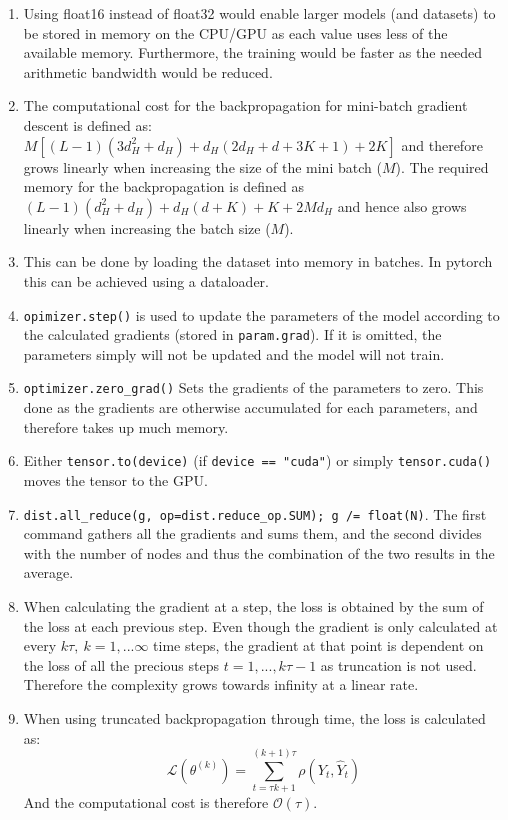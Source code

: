 \documentclass{article}
\begin{document}
\begin{enumerate}[label=(\alph*)]
	\item Using float16 instead of float32 would enable larger models (and datasets) to be stored in memory on the CPU/GPU as each value uses less of the available memory. Furthermore, the training would be faster as the needed arithmetic bandwidth would be reduced. 
	\item The computational cost for the backpropagation for mini-batch gradient descent is defined as: $M\left[(L-1)(3d_H^2+d_H)+d_H(2d_H+d+3K+1)+2K\right]$ and therefore grows linearly when increasing the size of the mini batch ($M$). The required memory for the backpropagation is defined as $(L-1)(d_H^2+d_H)+d_H(d+K)+K+2Md_H$ and hence also grows linearly when increasing the batch size ($M$). 
	\item This can be done by loading the dataset into memory in batches. In pytorch this can be achieved using a dataloader. 
	\item \lstinline{opimizer.step()} is used to update the parameters of the model according to the calculated gradients (stored in \lstinline{param.grad}). If it is omitted, the parameters simply will not be updated and the model will not train.
	\item \lstinline{optimizer.zero_grad()} Sets the gradients of the parameters to zero. This done as the gradients are otherwise accumulated for each parameters, and therefore takes up much memory.
	\item Either \lstinline{tensor.to(device)} (if \lstinline{device == "cuda"}) or simply \lstinline{tensor.cuda()} moves the tensor to the GPU. 
	\item \lstinline{dist.all_reduce(g, op=dist.reduce_op.SUM); g /= float(N)}. The first command gathers all the gradients and sums them, and the second divides with the number of nodes and thus the combination of the two results in the average.
	\item When calculating the gradient at a step, the loss is obtained by the sum of the loss at each previous step. Even though the gradient is only calculated at every $k\tau, \ k = 1, ... \infty$ time steps, the gradient at that point is dependent on the loss of all the precious steps $t = 1, ..., k\tau -1$ as truncation is not used. Therefore the complexity grows towards infinity at a linear rate.
	\item When using truncated backpropagation through time, the loss is calculated as: $$\mathcal{L}(\theta^{(k)}) = \sum_{t = \tau k + 1}^{(k+1) \tau} \rho(Y_t, \hat{Y}_t)$$
	And the computational cost is therefore $\mathcal{O}(\tau)$.
\end{enumerate}
\end{document}
